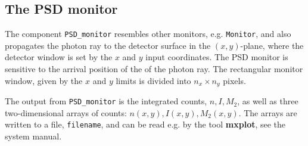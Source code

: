 \subsection*{The PSD monitor}
The component \texttt{PSD\_monitor} resembles other monitors, e.g.
\texttt{Monitor}, and also propagates the photon ray to the detector
surface in the $(x,y)$-plane, where the detector window is set
by the $x$ and $y$ input coordinates.
The PSD monitor is sensitive to the arrival position of the of the photon ray.
The rectangular monitor window, given by the $x$ and $y$
limits is divided into $n_x \times n_y$ pixels.

The output from \texttt{PSD\_monitor} is the integrated counts, $n, I, M_2$,
as well as
three two-dimensional arrays of counts: $n(x,y), I(x,y), M_2(x,y)$.
The arrays are written to a file, \verb+filename+, and can be read e.g. by the tool
\textbf{mxplot}, see the system manual.
